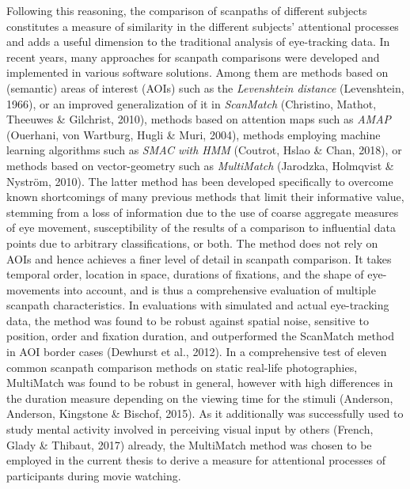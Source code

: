 \documentclass[a4paper, 11pt]{scrreprt}
\begin{document}
Following this reasoning, the comparison of scanpaths of different subjects constitutes a measure of similarity in the different subjects’ attentional processes and adds a useful dimension to the traditional analysis of eye-tracking data. In recent years, many approaches for scanpath comparisons were developed and implemented in various software solutions. Among them are methods based on (semantic) areas of interest (AOIs) such as the \textit{Levenshtein distance} (Levenshtein, 1966), or an improved generalization of it in \textit{ScanMatch} (Christino, Mathot, Theeuwes \& Gilchrist, 2010), methods based on attention maps such as \textit{AMAP} (Ouerhani, von Wartburg, Hugli \& Muri, 2004), methods employing machine learning algorithms such as \textit{SMAC with HMM} (Coutrot, Hslao \& Chan, 2018), or methods based on vector-geometry such as \textit{MultiMatch} (Jarodzka, Holmqvist \& Nyström, 2010). The latter method has been developed specifically to overcome known shortcomings of many previous methods that limit their informative value, stemming from a loss of information due to the use of coarse aggregate measures of eye movement, susceptibility of the results of a comparison to influential data points due to arbitrary classifications, or both. The method does not rely on AOIs and hence achieves a finer level of detail in scanpath comparison. It takes temporal order, location in space, durations of fixations, and the shape of eye-movements into account, and is thus a comprehensive evaluation of multiple scanpath characteristics. In evaluations with simulated and actual eye-tracking data, the method was found to be robust against spatial noise, sensitive to position, order and fixation duration, and outperformed the ScanMatch method in AOI border cases (Dewhurst et al., 2012). In a comprehensive test of eleven common scanpath comparison methods on static real-life photographies, MultiMatch was found to be robust in general, however with high differences in the duration measure depending on the viewing time for the stimuli (Anderson, Anderson, Kingstone \& Bischof, 2015). As it additionally was successfully used to study mental activity involved in perceiving visual input by others (French, Glady \& Thibaut, 2017) already, the MultiMatch method was chosen to be employed in the current thesis to derive a measure for attentional processes of participants during movie watching. 
\end{document}
